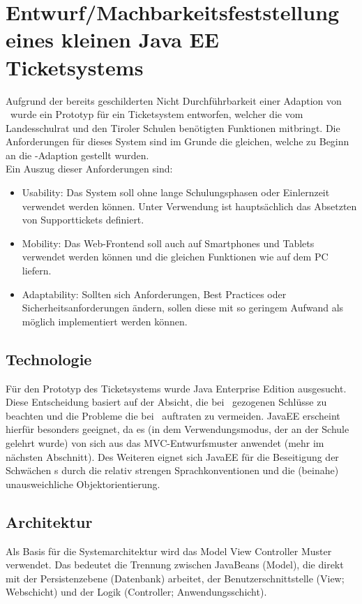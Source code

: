 \chapter[Systementwurf]{Entwurf/Machbarkeitsfeststellung eines kleinen Java EE Ticketsystems}

\def \currentAuthor{Jakob Tomasi}
Aufgrund der bereits geschilderten Nicht Durchführbarkeit einer Adaption von \getOst\ wurde ein Prototyp für ein Ticketsystem entworfen, welcher die vom Landesschulrat und den Tiroler Schulen benötigten Funktionen mitbringt. Die Anforderungen für dieses System sind im Grunde die gleichen, welche zu Beginn an die \getOst-Adaption gestellt wurden. 
\\
Ein Auszug dieser Anforderungen sind:

\begin{itemize}
	\item Usability: Das System soll ohne lange Schulungsphasen oder Einlernzeit verwendet werden können. Unter Verwendung ist hauptsächlich das Absetzten von Supporttickets definiert.
	\item Mobility: Das Web-Frontend soll auch auf Smartphones und Tablets verwendet werden können und die gleichen Funktionen wie auf dem PC liefern.
	\item Adaptability: Sollten sich Anforderungen, Best Practices oder Sicherheitsanforderungen ändern, sollen diese mit so geringem Aufwand als möglich implementiert werden können.
\end{itemize}

\section{Technologie}
Für den Prototyp des Ticketsystems wurde Java Enterprise Edition ausgesucht. Diese Entscheidung basiert auf der Absicht, die bei \getOst\ gezogenen Schlüsse zu beachten und die Probleme die bei \getOst\ auftraten zu vermeiden. JavaEE erscheint hierfür besonders geeignet, da es (in dem Verwendungsmodus, der an der Schule gelehrt wurde) von sich aus das MVC-Entwurfsmuster anwendet (mehr im nächsten Abschnitt). Des Weiteren eignet sich JavaEE für die Beseitigung der Schwächen \getOst s durch die relativ strengen Sprachkonventionen und die (beinahe) unausweichliche Objektorientierung.

\section{Architektur}
Als Basis für die Systemarchitektur wird das Model View Controller Muster verwendet. Das bedeutet die Trennung zwischen JavaBeans (Model), die direkt mit der Persistenzebene (Datenbank) arbeitet, der Benutzerschnittstelle (View; Webschicht) und der Logik (Controller; Anwendungsschicht).

